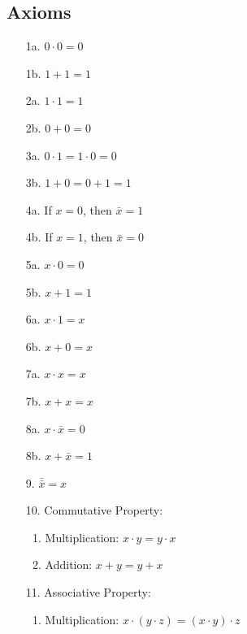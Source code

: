 \documentclass[12pt,openany, tikz,border=10pt]{book}
\begin{document}
        \subsection{Axioms}
        \begin{multicols}{3} %
            \begin{enumerate}
                \item[1a.] $0 \cdot 0 = 0$
                \item[1b.] $1 + 1 = 1$
                \item[2a.] $1 \cdot 1 = 1$
                \item[2b.] $0 + 0 = 0$
                \item[3a.] $0 \cdot 1 = 1 \cdot 0 = 0$
                \item[3b.] $1 + 0 = 0 + 1 = 1$
                \item[4a.] If $x = 0$, then $\bar{x} = 1$
                \item[4b.] If $x = 1$, then $\bar{x} = 0$
                \item[5a.] $x \cdot 0 = 0$
                \item[5b.] $x + 1 = 1$
                \item[6a.] $x \cdot 1 = x$
                \item[6b.] $x + 0 = x$
                \item[7a.] $x \cdot x = x$
                \item[7b.] $x + x = x$
                \item[8a.] $x \cdot \bar{x} = 0$
                \item[8b.] $x + \bar{x} = 1$
                \item[9.] $\bar{\bar{x}} = x$
                \item[] \vspace*{20px}
                \item[10.] Commutative Property:
                \begin{enumerate}
                  \item Multiplication: \( x \cdot y = y \cdot x \)
                  \item Addition: \( x + y = y + x \)
                \end{enumerate}
                \item[11.] Associative Property:
                \begin{enumerate}
                  \item Multiplication: \( x \cdot (y \cdot z) = (x \cdot y) \cdot z \)

\end{enumerate}
\end{enumerate}
\end{multicols}
\end{document}
